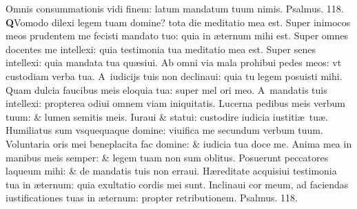 \documentclass[a5paper,10pt]{book}
\def\ae{æ}
\begin{document}
\begin{multicols*}{2}
\newline \color{red} O\color{black}mnis consummationis vidi finem: latum mandatum tuum nimis. \quad \color{red} Psalmus. \hypertarget{ps118.7}{118.} \color{black}
\vspace{-.5em}
\lettrine[lines=2]{\bfseries \color{red} Q}{}Vomodo dilexi legem tuam domine? tota die meditatio mea est.
\newline \color{red} S\color{black}uper inimocos meos prudentem me fecisti mandato tuo: quia in \ae ternum mihi est.
\newline \color{red} S\color{black}uper omnes docentes me intellexi: quia testimonia tua meditatio mea est.
\newline \color{red} S\color{black}uper senes intellexi: quia mandata tua qu\ae siui.
\newline \color{red} A\color{black}b omni via mala prohibui pedes meos: vt custodiam verba tua.
\newline \color{red} A\color{black}\ iudicijs tuis non declinaui: quia tu legem posuisti mihi.
\newline \color{red} Q\color{black}uam dulcia faucibus meis eloquia tua: super mel ori meo.
\newline \color{red} A\color{black}\ mandatis tuis intellexi: propterea odiui omnem viam iniquitatis.
\newline \color{red} L\color{black}ucerna pedibus meis verbum tuum: \& lumen semitis meis.
\newline \color{red} I\color{black}uraui \& statui: custodire iudicia iustiti\ae \ tu\ae .
\newline \color{red} H\color{black}umiliatus sum vsquequaque domine: viuifica me secundum verbum tuum.
\newline \color{red} V\color{black}oluntaria oris mei beneplacita fac domine: \& iudicia tua doce me.
\newline \color{red} A\color{black}nima mea in manibus meis semper: \& legem tuam non sum oblitus.
\newline \color{red} P\color{black}osuerunt peccatores laqueum mihi: \& de mandatis tuis non erraui.
\newline \color{red} H\color{black}\ae reditate acquisiui testimonia tua in \ae ternum: quia exultatio cordis mei sunt.
\newline \color{red} I\color{black}nclinaui cor meum, ad faciendas iustificationes tuas in \ae ternum: propter retributionem. \quad \color{red} Psalmus. \hypertarget{ps118.8}{118.} \color{black}
\vspace{-.5em}

\end{multicols*}
\end{document}
